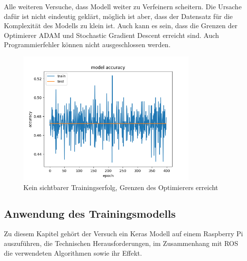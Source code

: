 \documentclass[conference]{IEEEtran}
\begin{document}
	Alle weiteren Versuche, dass Modell weiter zu Verfeinern scheitern. Die 
	Ursache dafür ist nicht eindeutig geklärt, möglich ist aber, 
	dass der Datensatz für die Komplexität des Modells zu klein ist. Auch 
	kann es sein, dass die Grenzen der Optimierer ADAM und Stochastic 
	Gradient Descent erreicht sind. Auch Programmierfehler können nicht 
	ausgeschlossen werden. 
	
	\begin{figure}[!h]
		\centering
		\includegraphics[width=9cm]{img/480x360:400@32_accuracy.png}
		\caption{Kein sichtbarer Trainingserfolg, Grenzen des Optimierers 
		erreicht}
		\label{erfolgloos }
	\end{figure}
	
	
	\subsection{Anwendung des Trainingsmodells} %
	Zu diesem Kapitel gehört der Versuch ein Keras Modell auf einem 
	Raspberry Pi auszuführen, die Technischen Herausforderungen, im 
	Zusammenhang mit ROS  die verwendeten Algorithmen sowie ihr Effekt. 
	
\end{document}
